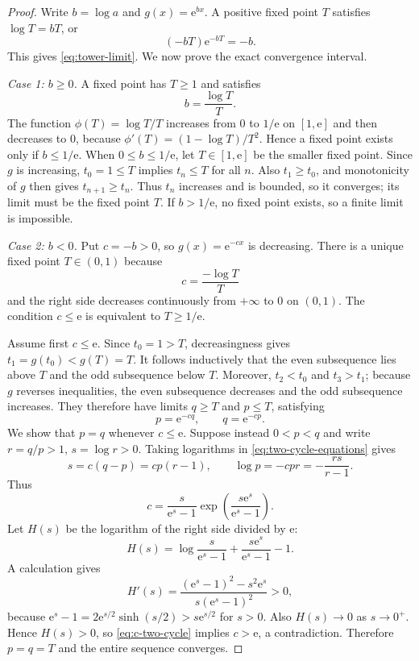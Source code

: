 \documentclass[11pt]{article}
\numberwithin{equation}{section}
\theoremstyle{definition}
\theoremstyle{remark}
\newcommand{\e}{\mathrm e}
\begin{document}
\begin{proof}
Write $b=\log a$ and $g(x)=\e^{bx}$.  A positive fixed point $T$ satisfies
$\log T=bT$, or
\begin{equation}
  (-bT)\e^{-bT}=-b.                                   \label{eq:tower-W-transform}
\end{equation}
This gives \eqref{eq:tower-limit}.  We now prove the exact convergence
interval.

\emph{Case 1: $b\ge0$.}
A fixed point has $T\ge1$ and satisfies
\[
  b=\frac{\log T}{T}.
\]
The function $\phi(T)=\log T/T$ increases from $0$ to $1/\e$ on $[1,\e]$ and
then decreases to $0$, because
$\phi'(T)=(1-\log T)/T^2$.  Hence a fixed point exists only if
$b\le1/\e$.  When $0\le b\le1/\e$, let $T\in[1,\e]$ be the smaller fixed
point.  Since $g$ is increasing, $t_0=1\le T$ implies $t_n\le T$ for all $n$.
Also $t_1\ge t_0$, and monotonicity of $g$ then gives
$t_{n+1}\ge t_n$.  Thus $t_n$ increases and is bounded, so it converges; its
limit must be the fixed point $T$.  If $b>1/\e$, no fixed point exists, so a
finite limit is impossible.

\emph{Case 2: $b<0$.}
Put $c=-b>0$, so $g(x)=\e^{-cx}$ is decreasing.  There is a unique fixed point
$T\in(0,1)$ because
\[
 c=\frac{-\log T}{T}
\]
and the right side decreases continuously from $+\infty$ to $0$ on $(0,1)$.
The condition $c\le\e$ is equivalent to $T\ge1/\e$.

Assume first $c\le\e$.  Since $t_0=1>T$, decreasingness gives
$t_1=g(t_0)<g(T)=T$.  It follows inductively that the even subsequence lies
above $T$ and the odd subsequence below $T$.  Moreover, $t_2<t_0$ and
$t_3>t_1$; because $g$ reverses inequalities, the even subsequence decreases
and the odd subsequence increases.  They therefore have limits $q\ge T$ and
$p\le T$, satisfying
\begin{equation}
 p=\e^{-cq},\qquad q=\e^{-cp}.                         \label{eq:two-cycle-equations}
\end{equation}
We show that $p=q$ whenever $c\le\e$.  Suppose instead $0<p<q$ and write
$r=q/p>1$, $s=\log r>0$.  Taking logarithms in
\eqref{eq:two-cycle-equations} gives
\[
 s=c(q-p)=cp(r-1),
 \qquad
 \log p=-cpr=-\frac{rs}{r-1}.
\]
Thus
\begin{equation}
 c=\frac{s}{\e^s-1}
    \exp\!\left(\frac{s\e^s}{\e^s-1}\right).         \label{eq:c-two-cycle}
\end{equation}
Let $H(s)$ be the logarithm of the right side divided by $\e$:
\[
 H(s)=\log\frac{s}{\e^s-1}
      +\frac{s\e^s}{\e^s-1}-1.
\]
A calculation gives
\[
 H'(s)=\frac{(\e^s-1)^2-s^2\e^s}
              {s(\e^s-1)^2}>0,
\]
because
$\e^s-1=2\e^{s/2}\sinh(s/2)>s\e^{s/2}$ for $s>0$.
Also $H(s)\to0$ as $s\to0^+$.  Hence $H(s)>0$, so
\eqref{eq:c-two-cycle} implies $c>\e$, a contradiction.  Therefore $p=q=T$
and the entire sequence converges.


\end{proof}
\end{document}
